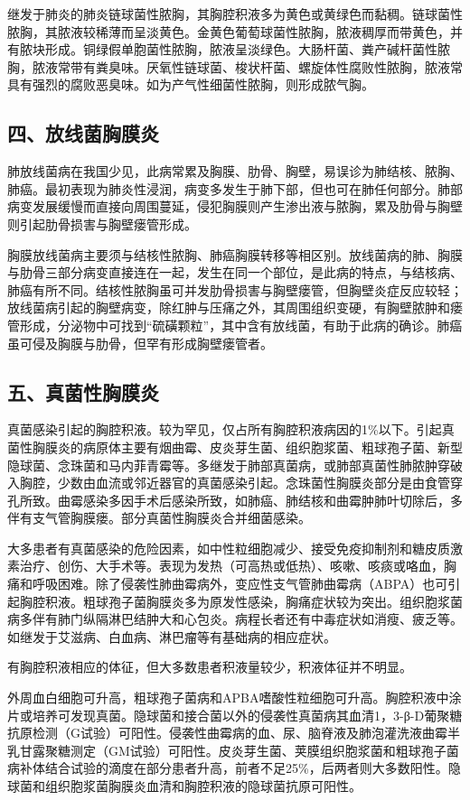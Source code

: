 继发于肺炎的肺炎链球菌性脓胸，其胸腔积液多为黄色或黄绿色而黏稠。链球菌性脓胸，其脓液较稀薄而呈淡黄色。金黄色葡萄球菌性脓胸，脓液稠厚而带黄色，并有脓块形成。铜绿假单胞菌性脓胸，脓液呈淡绿色。大肠杆菌、粪产碱杆菌性脓胸，脓液常带有粪臭味。厌氧性链球菌、梭状杆菌、螺旋体性腐败性脓胸，脓液常具有强烈的腐败恶臭味。如为产气性细菌性脓胸，则形成脓气胸。

\subsection{四、放线菌胸膜炎}

肺放线菌病在我国少见，此病常累及胸膜、肋骨、胸壁，易误诊为肺结核、脓胸、肺癌。最初表现为肺炎性浸润，病变多发生于肺下部，但也可在肺任何部分。肺部病变发展缓慢而直接向周围蔓延，侵犯胸膜则产生渗出液与脓胸，累及肋骨与胸壁则引起肋骨损害与胸壁瘘管形成。

胸膜放线菌病主要须与结核性脓胸、肺癌胸膜转移等相区别。放线菌病的肺、胸膜与肋骨三部分病变直接连在一起，发生在同一个部位，是此病的特点，与结核病、肺癌有所不同。结核性脓胸虽可并发肋骨损害与胸壁瘘管，但胸壁炎症反应较轻；放线菌病引起的胸壁病变，除红肿与压痛之外，其周围组织变硬，有胸壁脓肿和瘘管形成，分泌物中可找到“硫磺颗粒”，其中含有放线菌，有助于此病的确诊。肺癌虽可侵及胸膜与肋骨，但罕有形成胸壁瘘管者。

\subsection{五、真菌性胸膜炎}

真菌感染引起的胸腔积液。较为罕见，仅占所有胸腔积液病因的1\%以下。引起真菌性胸膜炎的病原体主要有烟曲霉、皮炎芽生菌、组织胞浆菌、粗球孢子菌、新型隐球菌、念珠菌和马内菲青霉等。多继发于肺部真菌病，或肺部真菌性肺脓肿穿破入胸腔，少数由血流或邻近器官的真菌感染引起。念珠菌性胸膜炎部分是由食管穿孔所致。曲霉感染多因手术后感染所致，如肺癌、肺结核和曲霉肿肺叶切除后，多伴有支气管胸膜瘘。部分真菌性胸膜炎合并细菌感染。

大多患者有真菌感染的危险因素，如中性粒细胞减少、接受免疫抑制剂和糖皮质激素治疗、创伤、大手术等。表现为发热（可高热或低热）、咳嗽、咳痰或咯血，胸痛和呼吸困难。除了侵袭性肺曲霉病外，变应性支气管肺曲霉病（ABPA）也可引起胸腔积液。粗球孢子菌胸膜炎多为原发性感染，胸痛症状较为突出。组织胞浆菌病多伴有肺门纵隔淋巴结肿大和心包炎。病程长者还有中毒症状如消瘦、疲乏等。如继发于艾滋病、白血病、淋巴瘤等有基础病的相应症状。

有胸腔积液相应的体征，但大多数患者积液量较少，积液体征并不明显。

外周血白细胞可升高，粗球孢子菌病和APBA嗜酸性粒细胞可升高。胸腔积液中涂片或培养可发现真菌。隐球菌和接合菌以外的侵袭性真菌病其血清1，3-β-D葡聚糖抗原检测（G试验）可阳性。侵袭性曲霉病的血、尿、脑脊液及肺泡灌洗液曲霉半乳甘露聚糖测定（GM试验）可阳性。皮炎芽生菌、荚膜组织胞浆菌和粗球孢子菌病补体结合试验的滴度在部分患者升高，前者不足25\%，后两者则大多数阳性。隐球菌和组织胞浆菌胸膜炎血清和胸腔积液的隐球菌抗原可阳性。

